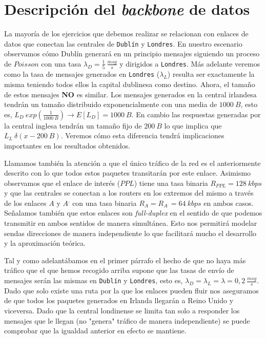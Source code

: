 \documentclass{article}[10pt]
\begin{document}
	\section{Descripción del \textit{backbone} de datos}
		La mayoría de los ejercicios que debemos realizar se relacionan con enlaces de datos que conectan las centrales de \texttt{Dublín} y \texttt{Londres}. En nuestro escenario observamos cómo Dublín generará en un principio mensajes siguiendo un proceso de $Poisson$ con una tasa $\lambda_D = \frac{1}{5}\ \frac{msg}{s}$ y dirigidos a \texttt{Londres}. Más adelante veremos como la tasa de mensajes generados en \texttt{Londres} ($\lambda_L$) resulta ser exactamente la misma teniendo todos ellos la capital dublinesa como destino. Ahora, el tamaño de estos mensajes \textbf{NO} es similar. Los mensajes generados en la central irlandesa tendrán un tamaño distribuido exponencialmente con una media de $1000\ B$, esto es, $L_D ~ exp(\frac{1}{1000\ B}) \rightarrow E[L_D] = 1000\ B$. En cambio las respuestas generadas por la central inglesa tendrán un tamaño fijo de $200\ B$ lo que implica que $L_L ~ \delta(x - 200\ B)$. Veremos cómo esta diferencia tendrá implicaciones importantes en los resultados obtenidos.

		Llamamos también la atención a que el único tráfico de la red es el anteriormente descrito con lo que todos estos paquetes transitarán por este enlace. Asimismo observamos que el enlace de interés ($PPL$) tiene una tasa binaria $R_{PPL} = 128\ kbps$ y que las centrales se conectan a los routers en los extremos del mismo a través de los enlaces $A$ y $A^,$ con una tasa binaria $R_A = R_{A^,} = 64\ kbps$ en ambos casos. Señalamos también que estos enlaces son \textit{full-duplex} en el sentido de que podemos transmitir en ambos sentidos de manera simultánea. Esto nos permitirá modelar sendas direcciones de manera independiente lo que facilitará mucho el desarrollo y la aproximación teórica.

		Tal y como adelantábamos en el primer párrafo el hecho de que no haya más tráfico que el que hemos recogido arriba supone que las tasas de envío de mensajes serán las mismas en \texttt{Dublín} y \texttt{Londres}, esto es, $\lambda_D = \lambda_L = \lambda = 0,2\ \frac{msg}{s}$. Dado que solo existe una ruta por la que los enlaces pueden fluir nos aseguramos de que todos los paquetes generados en Irlanda llegarán a Reino Unido y viceversa. Dado que la central londinense se limita tan solo a responder los mensajes que le llegan (no "genera" tráfico de manera independiente) se puede comprobar que la igualdad anterior en efecto se mantiene.
\end{document}
